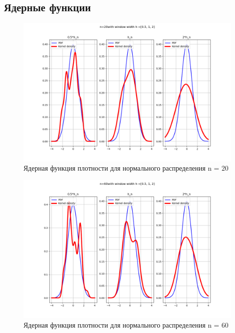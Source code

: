 \documentclass[a4]{article}
\begin{document}
\subsection{Ядерные функции}
\begin{center}
	
	\begin{figure}[H]
		\caption{Ядерная функция плотности для нормального распределения n = $20$ }
		\includegraphics[width=\textwidth]{Lab4_normal_pdf_20.png}
	\end{figure}
	
	\begin{figure}[H]
		\caption{Ядерная функция плотности для нормального распределения n = $60$ }
		\includegraphics[width=\textwidth]{Lab4_normal_pdf_60.png}
	\end{figure}
	

\end{center}
\end{document}
